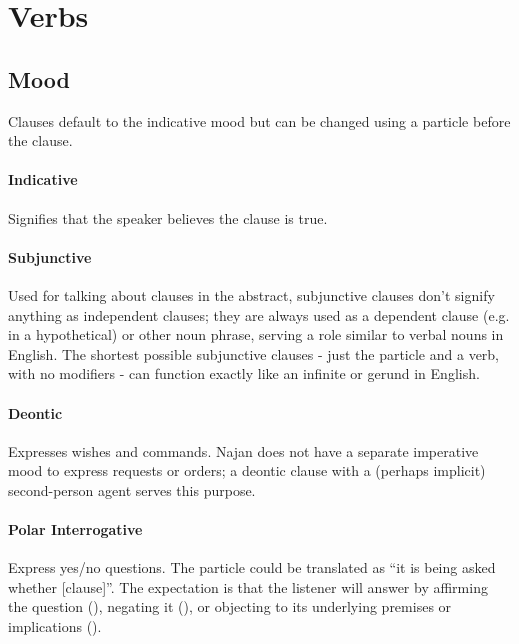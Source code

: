 \section{Verbs} \label{sec:verbs}

\subsection{Mood} \label{sec:mood}

Clauses default to the indicative mood but can be changed using a particle
before the clause.

\paragraph{Indicative} Signifies that the speaker believes the clause is true.

\paragraph{Subjunctive} Used for talking about clauses in the abstract,
subjunctive clauses don't signify anything as independent clauses; they are
always used as a dependent clause (e.g. in a hypothetical) or other noun phrase,
serving a role similar to verbal nouns in English. The shortest possible
subjunctive clauses - just the particle and a verb, with no modifiers - can
function exactly like an infinite or gerund in English.

\paragraph{Deontic} Expresses wishes and commands. Najan does not have a
separate imperative mood to express requests or orders; a deontic clause with a
(perhaps implicit) second-person agent serves this purpose.

\paragraph{Polar Interrogative} Express yes/no questions. The particle
 could be translated as ``it is being asked whether [clause]''. The
expectation is that the listener will answer by affirming the question
(), negating it (), or objecting to its underlying
premises or implications ().



